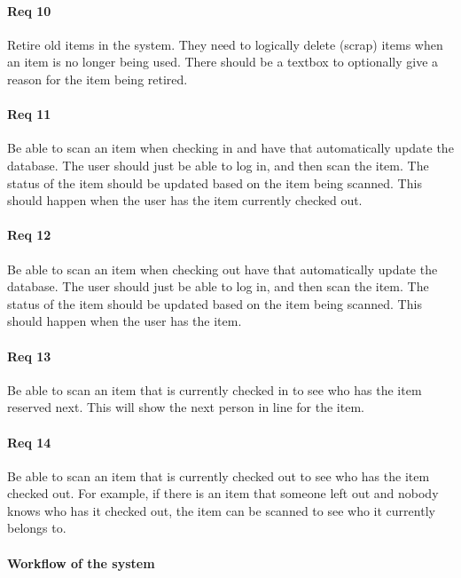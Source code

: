 \documentclass[10pt, onecolumn, twoside, peerreview]{IEEEtran}
\begin{document}
\paragraph*{Req 10} Retire old items in the system. They need to logically delete (scrap) items when an item is no longer being used. There
should be a textbox to optionally give a reason for the item being retired.\\

\paragraph*{Req 11} Be able to scan an item when checking in and have that automatically update the database. The user should just be able
to log in, and then scan the item. The status of the item should be updated based on the item being scanned. This
should happen when the user has the item currently checked out.\\

\paragraph*{Req 12} Be able to scan an item when checking out have that automatically update the database. The user should just be able to
log in, and then scan the item. The status of the item should be updated based on the item being scanned. This should
happen when the user has the item.\\

\paragraph*{Req 13} Be able to scan an item that is currently checked in to see who has the item reserved next. This will show the next
person in line for the item.\\

\paragraph*{Req 14} Be able to scan an item that is currently checked out to see who has the item checked out. For example, if there is an
item that someone left out and nobody knows who has it checked out, the item can be scanned to see who it currently
belongs to.\\

\paragraph*{Workflow of the system}
\end{document}
